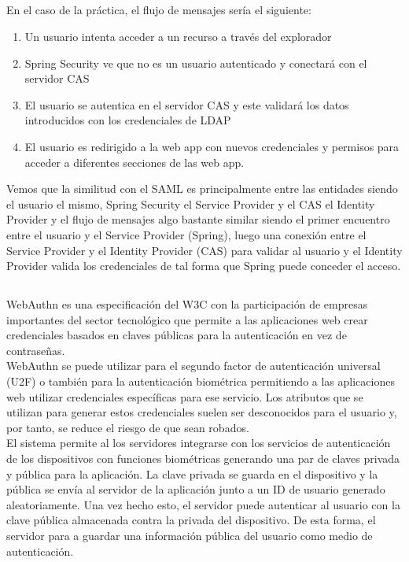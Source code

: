 \documentclass[10pt,a4paper]{article}
\begin{document}
\subsection{}
En el caso de la práctica, el flujo de mensajes sería el siguiente:
\begin{enumerate}
\item Un usuario intenta acceder a un recurso a través del explorador
\item Spring Security ve que no es un usuario autenticado y conectará con el servidor CAS
\item El usuario se autentica en el servidor CAS y este validará los datos introducidos con los credenciales de LDAP
\item El usuario es redirigido a la web app con nuevos credenciales y permisos para acceder a diferentes secciones de las web app.
\end{enumerate}

Vemos que la similitud con el SAML es principalmente entre las entidades siendo el usuario el mismo, Spring Security el Service Provider y el CAS el Identity Provider y el flujo de mensajes algo bastante similar siendo el primer encuentro entre el usuario y el Service Provider (Spring), luego una conexión entre el Service Provider y el Identity Provider (CAS) para validar al usuario y el Identity Provider valida los credenciales de tal forma que Spring puede conceder el acceso.
\subsection{}

WebAuthn es una especificación del W3C con la participación de empresas importantes del sector tecnológico que permite a las aplicaciones web crear credenciales basados en claves públicas para la autenticación en vez de contraseñas.\\
WebAuthn se puede utilizar para el segundo factor de autenticación universal (U2F) o también para la autenticación biométrica permitiendo a las aplicaciones web utilizar credenciales específicas para ese servicio. Los atributos que se utilizan para generar estos credenciales suelen ser desconocidos para el usuario y, por tanto, se reduce el riesgo de que sean robados.\\

El sistema permite al los servidores integrarse con los servicios de autenticación de los dispositivos con funciones biométricas generando una par de claves privada y pública para la aplicación. La clave privada se guarda en el dispositivo y la pública se envía al servidor de la aplicación junto a un ID de usuario generado aleatoriamente. Una vez hecho esto, el servidor puede autenticar al usuario con la clave pública almacenada contra la privada del dispositivo. De esta forma, el servidor para a guardar una información pública del usuario como medio de autenticación.
\end{document}
